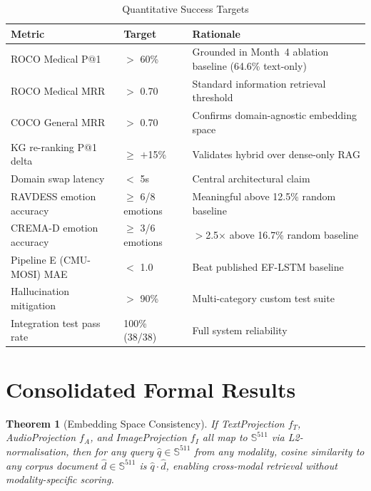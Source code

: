\documentclass[12pt,a4paper]{article}
\theoremstyle{definition}
\theoremstyle{plain}
\newtheorem{theorem}{Theorem}[section]
\theoremstyle{remark}
\newcommand{\Sph}{\mathbb{S}}
\begin{document}
\begin{table}[H]
\centering
\caption{Quantitative Success Targets}
\renewcommand{\arraystretch}{1.3}
\begin{tabularx}{\textwidth}{@{}p{5.5cm} p{2.8cm} p{5.0cm}@{}}
\toprule
\textbf{Metric} & \textbf{Target} & \textbf{Rationale} \\
\midrule
ROCO Medical P@1            & $>$ 60\%     & Grounded in Month~4 ablation baseline (64.6\% text-only) \\
ROCO Medical MRR            & $>$ 0.70     & Standard information retrieval threshold \\
COCO General MRR            & $>$ 0.70     & Confirms domain-agnostic embedding space \\
KG re-ranking P@1 delta     & $\geq$ $+$15\%  & Validates hybrid over dense-only RAG \\
Domain swap latency         & $<$ 5s       & Central architectural claim \\
RAVDESS emotion accuracy    & $\geq$ 6/8 emotions & Meaningful above 12.5\% random baseline \\
CREMA-D emotion accuracy    & $\geq$ 3/6 emotions & $>$2.5$\times$ above 16.7\% random baseline \\
Pipeline E (CMU-MOSI) MAE   & $<$ 1.0      & Beat published EF-LSTM baseline \\
Hallucination mitigation    & $>$ 90\%     & Multi-category custom test suite \\
Integration test pass rate  & 100\% (38/38)& Full system reliability \\
\bottomrule
\end{tabularx}
\end{table}

\newpage
\section{Consolidated Formal Results}

\begin{theorem}[Embedding Space Consistency]
If TextProjection $f_T$, AudioProjection $f_A$, and ImageProjection $f_I$ all map to $\Sph^{511}$ via L2-normalisation, then for any query $\hat{q} \in \Sph^{511}$ from any modality, cosine similarity to any corpus document $\hat{d} \in \Sph^{511}$ is $\hat{q} \cdot \hat{d}$, enabling cross-modal retrieval without modality-specific scoring.
\end{theorem}
\end{document}

